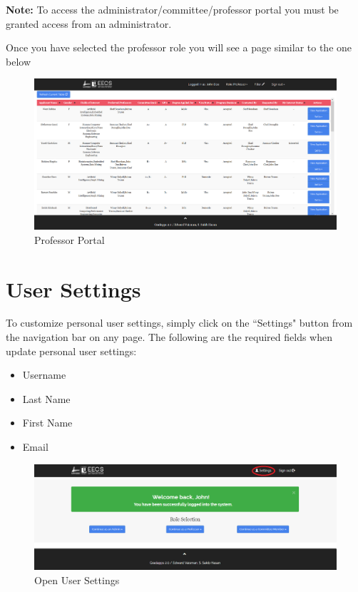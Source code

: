 \documentclass[fontsize=12pt,paper=letter,twoside]{scrartcl}
\begin{document}
\noindent \textbf{Note:} To access the administrator/committee/professor portal you must be granted access from an administrator.

\clearpage

Once you have selected the professor role you will see a page similar to the one below

\begin{figure}[!htb]
\begin{center}
\includegraphics[width=.99\textwidth]{images/professor.png}
\end{center}
\caption{Professor Portal}
\label{fig:professor}
\end{figure}

\clearpage

\section{User Settings}
\label{user-settings}
To customize personal user settings, simply click on the ``Settings" button from the navigation bar on any page. The following are the required fields when update personal user settings:
\begin{itemize}
\item Username
\item Last Name
\item First Name
\item Email
\end{itemize}

\begin{figure}[!htb]
\begin{center}
\includegraphics[width=.99\textwidth]{images/click_settings.png}
\end{center}
\caption{Open User Settings}
\label{fig:click_settings}
\end{figure}
\end{document}
